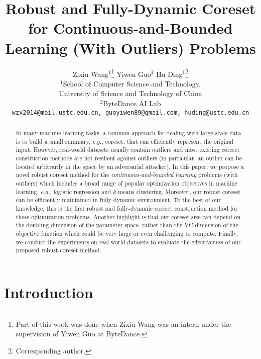 \documentclass{article}
\title{Robust and Fully-Dynamic Coreset for Continuous-and-Bounded Learning (With Outliers) Problems}
\author{%
	Zixiu Wang$^1$\thanks{Part of this work was done when Zixiu Wang was an intern under the supervision of Yiwen Guo at ByteDance.} \quad Yiwen Guo$^2$ \quad Hu Ding$^1$\thanks{Corresponding author.} \\
	{\small$^1$School of Computer Science and Technology,}\\
	{\small University of Science and Technology of China}\\
	{\small$^2$ByteDance AI Lab}\\
	{\small \texttt{wzx2014@mail.ustc.edu.cn, guoyiwen89@gmail.com, huding@ustc.edu.cn}}
}
\date{\vspace{-1cm}}
\begin{document}
\allowdisplaybreaks 

\maketitle
\begin{abstract}
In many machine learning tasks, a common approach for dealing with large-scale data is to build a small summary, {\em e.g.,} coreset,  that can efficiently represent the original input. However, real-world datasets usually contain outliers and most existing coreset construction methods are not resilient against outliers (in particular, an outlier can be located arbitrarily in the space by an adversarial attacker). In this paper, we propose a novel robust coreset method for the {\em continuous-and-bounded learning} problems (with outliers) which includes a broad range of popular optimization objectives in machine learning, {\em e.g.,} logistic regression and $ k $-means clustering. Moreover, our robust coreset  can be efficiently maintained in fully-dynamic environment. To the best of our knowledge, this is the first robust and fully-dynamic coreset construction method for these optimization problems. Another highlight is that our coreset size can depend on the doubling dimension of the parameter space, rather than the VC dimension of the objective function which could be very large or even challenging to compute. Finally, we conduct the experiments on real-world datasets to evaluate the effectiveness of our proposed robust coreset method. 

\end{abstract}


\section{Introduction}
\end{document}
